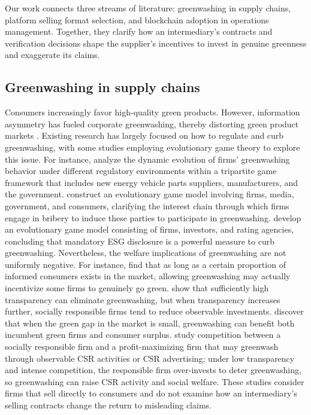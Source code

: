 \documentclass[preprint,review,12pt,authoryear,nopreprintline]{elsarticle}
\theoremstyle{definition}
\begin{document}
Our work connects three streams of literature: greenwashing in supply chains, platform selling format selection, and blockchain adoption in operations management. Together, they clarify how an intermediary's contracts and verification decisions shape the supplier's incentives to invest in genuine greenness and exaggerate its claims.

\subsection{Greenwashing in supply chains}\label{sec:2.1}

Consumers increasingly favor high-quality green products. However, information asymmetry has fueled corporate greenwashing, thereby distorting green product markets \citep{chen2023impact, Ye2024the}. Existing research has largely focused on how to regulate and curb greenwashing, with some studies employing evolutionary game theory to explore this issue. For instance, \citet{Gao2025esg} analyze the dynamic evolution of firms' greenwashing behavior under different regulatory environments within a tripartite game framework that includes new energy vehicle parts suppliers, manufacturers, and the government. \citet{wang2025go} construct an evolutionary game model involving firms, media, government, and consumers, clarifying the interest chain through which firms engage in bribery to induce these parties to participate in greenwashing. \citet{hao2026un} develop an evolutionary game model consisting of firms, investors, and rating agencies, concluding that mandatory ESG disclosure is a powerful measure to curb greenwashing. Nevertheless, the welfare implications of greenwashing are not uniformly negative. For instance, \citet{lee2018cor} find that as long as a certain proportion of informed consumers exists in the market, allowing greenwashing may actually incentivize some firms to genuinely go green. \citet{wu2020bad} show that sufficiently high transparency can eliminate greenwashing, but when transparency increases further, socially responsible firms tend to reduce observable investments. \citet{huang2020coml} discover that when the green gap in the market is small, greenwashing can benefit both incumbent green firms and consumer surplus. \citet{Wei2026} study competition between a socially responsible firm and a profit-maximizing firm that may greenwash through observable CSR activities or CSR advertising; under low transparency and intense competition, the responsible firm over-invests to deter greenwashing, so greenwashing can raise CSR activity and social welfare. These studies consider firms that sell directly to consumers and do not examine how an intermediary's selling contracts change the return to misleading claims.
\end{document}
